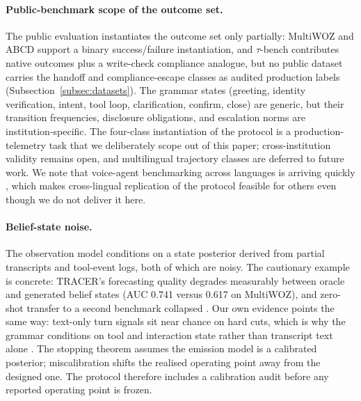 \paragraph{Public-benchmark scope of the outcome set.}
The public evaluation instantiates the outcome set only partially: MultiWOZ and ABCD support a binary success/failure instantiation, and $\tau$-bench contributes native outcomes plus a write-check compliance analogue, but no public dataset carries the handoff and compliance-escape classes as audited production labels (Subsection~\ref{subsec:datasets}).
The grammar states (greeting, identity verification, intent, tool loop, clarification, confirm, close) are generic, but their transition frequencies, disclosure obligations, and escalation norms are institution-specific.
The four-class instantiation of the protocol is a production-telemetry task that we deliberately scope out of this paper; cross-institution validity remains open, and multilingual trajectory classes are deferred to future work.
We note that voice-agent benchmarking across languages is arriving quickly \citep{tauvoice2026}, which makes cross-lingual replication of the protocol feasible for others even though we do not deliver it here.

\paragraph{Belief-state noise.}
The observation model conditions on a state posterior derived from partial transcripts and tool-event logs, both of which are noisy.
The cautionary example is concrete: TRACER's forecasting quality degrades measurably between oracle and generated belief states (AUC 0.741 versus 0.617 on MultiWOZ), and zero-shot transfer to a second benchmark collapsed \citep{nourbakhsh2026tracer}.
Our own evidence points the same way: text-only turn signals sit near chance on hard cuts, which is why the grammar conditions on tool and interaction state rather than transcript text alone \citep{garcia2026asking}.
The stopping theorem assumes the emission model is a calibrated posterior; miscalibration shifts the realised operating point away from the designed one.
The protocol therefore includes a calibration audit before any reported operating point is frozen.

